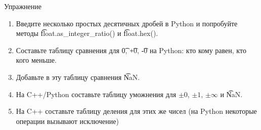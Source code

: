 \begin{frame}{Упражнение}
	\begin{enumerate}
		\item
			Введите несколько простых десятичных дробей в Python и попробуйте методы \t{float.as\_integer\_ratio()} и \t{float.hex()}.
		\item
			Составьте таблицу сравнения для \t{0}, \t{+0}, \t{-0} на Python: кто кому равен, кто кого меньше.
		\item
			Добавьте в эту таблицу сравнения \t{NaN}.
		\item
			На C++/Python составьте таблицу уможнения для $\pm0$, $\pm 1$, $\pm \infty$ и \t{NaN}.
		\item
			На C++ составьте таблицу деления для этих же чисел (на Python некоторые операции вызывают исключение)
	\end{enumerate}
\end{frame}
